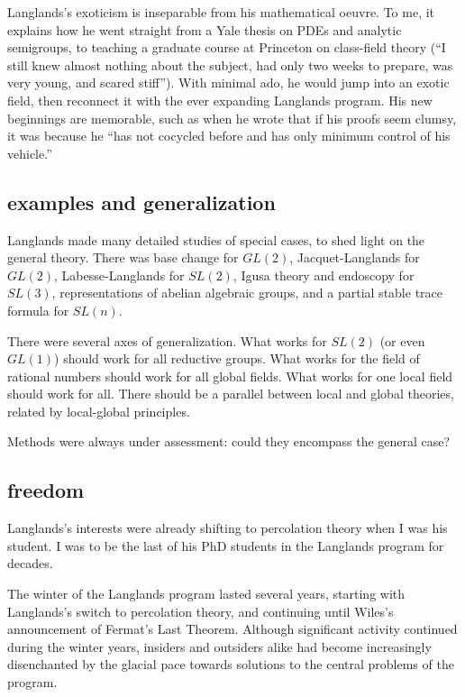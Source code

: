Langlands's exoticism is inseparable from his mathematical oeuvre.  To
me, it explains how he went straight from a Yale thesis on PDEs and
analytic semigroups, to teaching a graduate course at Princeton on
class-field theory (``I still knew almost nothing about the subject,
had only two weeks to prepare, was very young, and scared stiff'').
With minimal ado, he would jump into an exotic field, then reconnect
it with the ever expanding Langlands program.  His new beginnings are
memorable, such as when he wrote that if his proofs seem clumsy, it
was because he ``has not cocycled before and has only minimum control
of his vehicle.''

\subsection{examples and generalization}

Langlands made many detailed studies of special cases, to shed light
on the general theory. There was base change for $GL(2)$,
Jacquet-Langlands for $GL(2)$, Labesse-Langlands for $SL(2)$, Igusa
theory and endoscopy for $SL(3)$, representations of abelian algebraic
groups, and a partial stable trace formula for $SL(n)$.

There were several axes of generalization.  What works for $SL(2)$ (or
even $GL(1)$) should work for all reductive groups.  What works for
the field of rational numbers should work for all global fields.  What
works for one local field should work for all.  There should be a
parallel between local and global theories, related by local-global
principles.

Methods were always under assessment: could they encompass the general
case?

\subsection{freedom}

Langlands's interests were already shifting to percolation theory when
I was his student. I was to be the last of his PhD students in the
Langlands program for decades.

The winter of the Langlands program lasted several years, starting
with Langlands's switch to percolation theory, and continuing until
Wiles's announcement of Fermat's Last Theorem.  Although significant
activity continued during the winter years, insiders and outsiders
alike had become increasingly disenchanted by the glacial pace towards
solutions to the central problems of the program.

